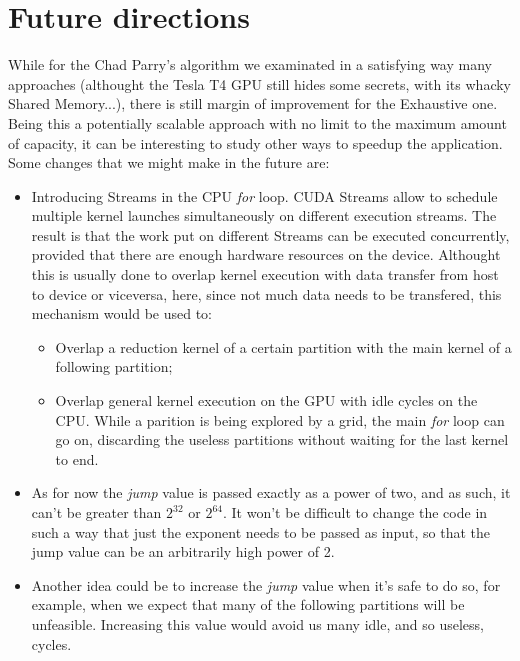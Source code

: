 \documentclass[12pt]{extarticle}
\begin{document}
\section{Future directions}
While for the Chad Parry's algorithm we examinated in a satisfying way many approaches (althought the Tesla T4 GPU still hides some secrets, with its whacky Shared Memory...), there is still margin of improvement for the Exhaustive one. Being this a potentially scalable approach with no limit to the maximum amount of capacity, it can be interesting to study other ways to speedup the application. Some changes that we might make in the future are:
\begin{itemize}
    \item Introducing Streams in the CPU \emph{for} loop. CUDA Streams allow to schedule multiple kernel launches simultaneously on different execution streams. The result is that the work put on different Streams can be executed concurrently, provided that there are enough hardware resources on the device. Althought this is usually done to overlap kernel execution with data transfer from host to device or viceversa, here, since not much data needs to be transfered, this mechanism would be used to:
    \begin{itemize}
        \item Overlap a reduction kernel of a certain partition with the main kernel of a following partition;
        \item Overlap general kernel execution on the GPU with idle cycles on the CPU. While a parition is being explored by a grid, the main \emph{for} loop can go on, discarding the useless partitions without waiting for the last kernel to end.
    \end{itemize}
    \item As for now the \emph{jump} value is passed exactly as a power of two, and as such, it can't be greater than $2^{32}$ or $2^{64}$. It won't be difficult to change the code in such a way that just the exponent needs to be passed as input, so that the jump value can be an arbitrarily high power of 2.
    \item Another idea could be to increase the \emph{jump} value when it's safe to do so, for example, when we expect that many of the following partitions will be unfeasible. Increasing this value would avoid us many idle, and so useless, cycles.
\end{itemize}



\clearpage

\end{document}

